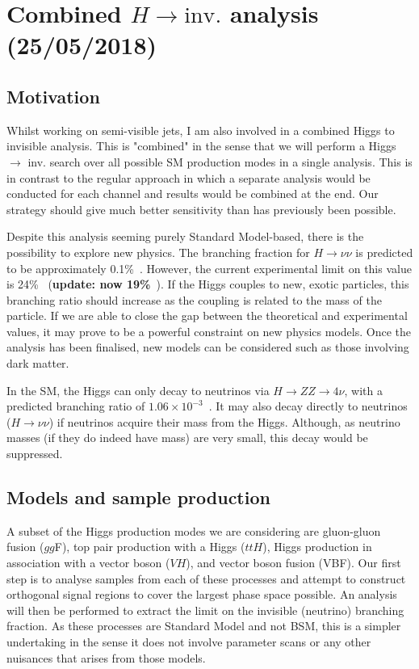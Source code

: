 \newpage
\chapter{Combined \texorpdfstring{$H \rightarrow \mathrm{inv.}$}{Higgs to invisible} analysis (25/05/2018)}

\section{Motivation}

Whilst working on semi-visible jets, I am also involved in a combined Higgs to invisible analysis. This is "combined" in the sense that we will perform a Higgs $\rightarrow$ inv. search over all possible SM production modes in a single analysis. This is in contrast to the regular approach in which a separate analysis would be conducted for each channel and results would be combined at the end. Our strategy should give much better sensitivity than has previously been possible.

Despite this analysis seeming purely Standard Model-based, there is the possibility to explore new physics. The branching fraction for $H \rightarrow \nu\nu$ is predicted to be approximately 0.1\%~\cite{Heinemeyer:1559921}. However, the current experimental limit on this value is 24\%~\cite{Khachatryan:2016whc} (\textbf{update: now 19\%}~\cite{Sirunyan:2018owy}). If the Higgs couples to new, exotic particles, this branching ratio should increase as the coupling is related to the mass of the particle. If we are able to close the gap between the theoretical and experimental values, it may prove to be a powerful constraint on new physics models. Once the analysis has been finalised, new models can be considered such as those involving dark matter.

In the SM, the Higgs can only decay to neutrinos via $H \rightarrow ZZ \rightarrow 4\nu$, with a predicted branching ratio of $1.06 \times 10^{-3}$~\cite{Heinemeyer:1559921}. It may also decay directly to neutrinos ($H \rightarrow \nu\nu$) if neutrinos acquire their mass from the Higgs. Although, as neutrino masses (if they do indeed have mass) are very small, this decay would be suppressed.


\section{Models and sample production}

A subset of the Higgs production modes we are considering are gluon-gluon fusion ($gg$F), top pair production with a Higgs ($ttH$), Higgs production in association with a vector boson ($VH$), and vector boson fusion (VBF). Our first step is to analyse samples from each of these processes and attempt to construct orthogonal signal regions to cover the largest phase space possible. An analysis will then be performed to extract the limit on the invisible (neutrino) branching fraction. As these processes are Standard Model and not BSM, this is a simpler undertaking in the sense it does not involve parameter scans or any other nuisances that arises from those models.

